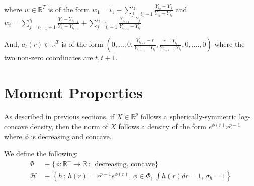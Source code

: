 \documentclass[12pt]{article}
\DeclareMathOperator*{\argmax}{argmax}
\begin{document}
where $w \in \mathbb{R}^T$ is of the form $w_1 = i_1 + \sum_{j=i_1+1}^{i_2} \frac{Y_{i_2} - Y_j}{Y_{i_2} - Y_{i_1}} $ and $w_t = \sum_{j=i_{t-1}+1}^{i_t} \frac{Y_j - Y_{i_{t-1}}}{Y_{i_t} - Y_{i_{t-1}}} +  \sum_{j=i_t+1}^{i_{t+1}} \frac{Y_{i_{t+1}} - Y_j}{Y_{i_{t+1}} - Y_{i_t}}$.

And, $a_t(r) \in \mathbb{R}^T$ is of the form $(0,...,0, \frac{Y_{i_{t+1}} - r}{Y_{i_{t+1}} - Y_{i_t}}, 
\frac{r - Y_{i_t}}{Y_{i_{t+1}} - Y_{i_t}}, 0, ...., 0)$ where the two non-zero coordinates are $t, t+1$. 





\section{Moment Properties}

As described in previous sections, if $X \in \mathbb{R}^p$ follows a spherically-symmetric log-concave density, then the norm of $X$ follows a density of the form $e^{\phi(r)}r^{p-1}$ where $\phi$ is decreasing and concave.


We define the following:
\begin{align}
  \Phi &\equiv \{ \phi: \mathbb{R}^+ \rightarrow \mathbb{R} \,:\, \textrm{ decreasing, concave} \} \label{defn:Phi} \\
  \mathcal{H} &\equiv \left\{ h \,:\, h(r) = r^{p-1} e^{\phi(r)}, \, \phi \in \Phi,\, \int h(r) dr = 1,\, \sigma_h = 1 \right\}
                 \label{defn:H_unit_variance}
\end{align}
\end{document}
